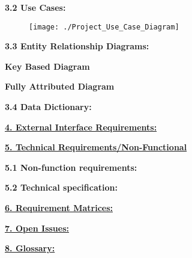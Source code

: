 \documentclass[12pt]{article}
\begin{document}
		
	\vspace{0.2in}
	
		\textbf{3.2 Use Cases:}
		\vspace{0.1in}
			\begin{figure}[htbp] %
				\centering
				\texttt{[image: ./Project\_Use\_Case\_Diagram]}
			\end{figure}
		
		
		
	\vspace{0.2in}
	
		\textbf{3.3 Entity Relationship Diagrams:}
		\vspace{0.2in}
		

		\vspace{0.1in}

			\begin{center}
			\textbf{Key Based Diagram}
			\end{center}
		
		\vspace{0.3in}
		
		
		\begin{center}
			\textbf{Fully Attributed Diagram}
			\end{center}
		
		\vspace{0.3in}
		
		

		
	\vspace{0.1in}
	
		\textbf{3.4 Data Dictionary:}
		\vspace{0.1in}
		
		
	\vspace{0.5in}
	
	\textbf{\underline{4. External Interface Requirements:}}
	\vspace{0.2in}
	
	
	
	\vspace{0.5in}
	
	\textbf{\underline{5. Technical Requirements/Non-Functional}}
	\vspace{0.2in}
	
		\textbf{5.1 Non-function requirements:}
		\vspace{0.1in}
				
		\textbf{5.2 Technical specification:} %
		\vspace{0.1in}
	
	\vspace{0.5in}
	
	\newpage
	\textbf{\underline{6. Requirement Matrices:}}
	\vspace{0.2in}
	
	
	
	\vspace{0.5in}
	
	\textbf{\underline{7. Open Issues:}}		
	\vspace{0.2in}
	
	
	
	\vspace{0.5in}
	
	\textbf{\underline{8. Glossary:}}
	\vspace{0.2in}
		
	
	\vspace{0.5in}
		
\end{document}
